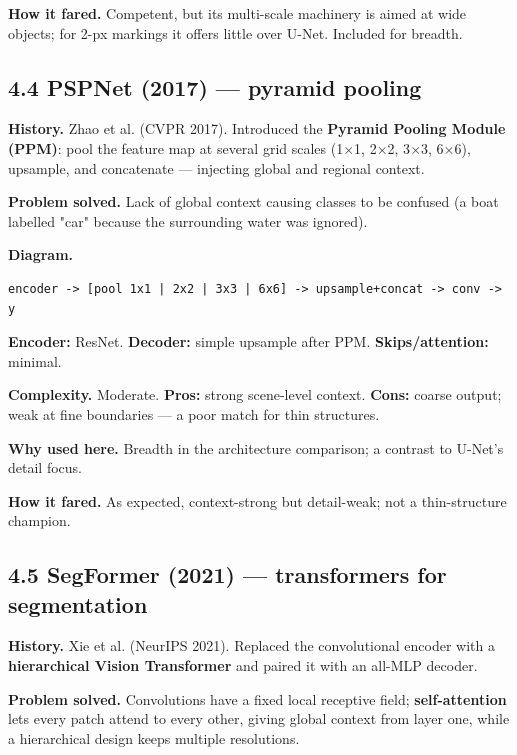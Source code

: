 \documentclass[11pt]{article}
\begin{document}
\textbf{How it fared.} Competent, but its multi-scale machinery is aimed at wide objects; for 2-px markings it offers little over U-Net. Included for breadth.

\subsection*{4.4 PSPNet (2017) --- pyramid pooling}

\textbf{History.} Zhao et al. (CVPR 2017). Introduced the \textbf{Pyramid Pooling Module (PPM)}: pool the feature map at several grid scales (1$\times$1, 2$\times$2, 3$\times$3, 6$\times$6), upsample, and concatenate --- injecting global and regional context.

\textbf{Problem solved.} Lack of global context causing classes to be confused (a boat labelled "car" because the surrounding water was ignored).

\textbf{Diagram.}
\begin{Verbatim}[breaklines=true,breakanywhere=true,fontsize=\footnotesize]
  encoder -> [pool 1x1 | 2x2 | 3x3 | 6x6] -> upsample+concat -> conv -> y
\end{Verbatim}

\textbf{Encoder:} ResNet. \textbf{Decoder:} simple upsample after PPM. \textbf{Skips/attention:} minimal.

\textbf{Complexity.} Moderate. \textbf{Pros:} strong scene-level context. \textbf{Cons:} coarse output; weak at fine boundaries --- a poor match for thin structures.

\textbf{Why used here.} Breadth in the architecture comparison; a contrast to U-Net's detail focus.

\textbf{How it fared.} As expected, context-strong but detail-weak; not a thin-structure champion.

\subsection*{4.5 SegFormer (2021) --- transformers for segmentation}

\textbf{History.} Xie et al. (NeurIPS 2021). Replaced the convolutional encoder with a \textbf{hierarchical Vision Transformer} and paired it with an all-MLP decoder.

\textbf{Problem solved.} Convolutions have a fixed local receptive field; \textbf{self-attention} lets every patch attend to every other, giving global context from layer one, while a hierarchical design keeps multiple resolutions.
\end{document}
